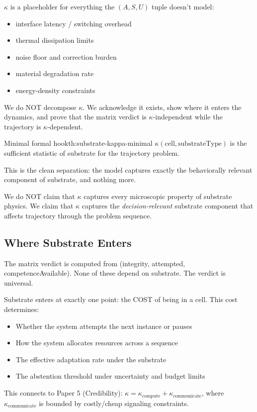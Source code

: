$\kappa$ is a placeholder for everything the $(A, S, U)$ tuple doesn't model:
\begin{itemize}
\item interface latency / switching overhead
\item thermal dissipation limits
\item noise floor and correction burden
\item material degradation rate
\item energy-density constraints
\end{itemize}

We do NOT decompose $\kappa$. We acknowledge it exists, show where it enters the dynamics, and prove that the matrix verdict is $\kappa$-independent while the trajectory is $\kappa$-dependent.

\begin{claim}{Minimal formal hook}{th:substrate-kappa-minimal}
$\kappa(\text{cell}, \text{substrateType})$ is the sufficient statistic of substrate for the trajectory problem.
\end{claim}


This is the clean separation: the model captures exactly the behaviorally relevant component of substrate, and nothing more.

We do NOT claim that $\kappa$ captures every microscopic property of substrate physics. We claim that $\kappa$ captures the \emph{decision-relevant} substrate component that affects trajectory through the problem sequence.

\subsection{Where Substrate Enters}

The matrix verdict is computed from (integrity, attempted, competenceAvailable). None of these depend on substrate. The verdict is universal.

Substrate enters at exactly one point: the COST of being in a cell. This cost determines:
\begin{itemize}
\item Whether the system attempts the next instance or pauses
\item How the system allocates resources across a sequence
\item The effective adaptation rate under the substrate
\item The abstention threshold under uncertainty and budget limits
\end{itemize}

This connects to Paper 5 (Credibility): $\kappa = \kappa_{\text{compute}} + \kappa_{\text{communicate}}$, where $\kappa_{\text{communicate}}$ is bounded by costly/cheap signaling constraints.

